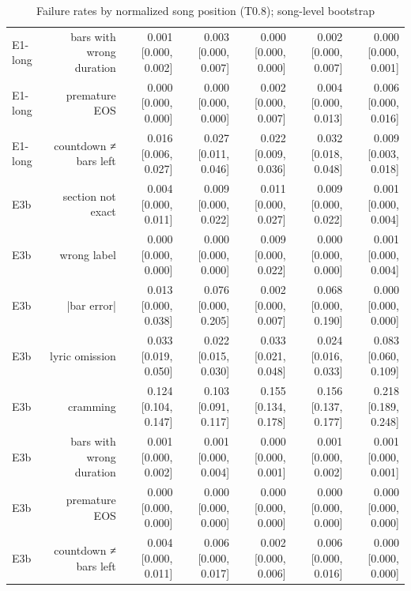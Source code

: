 \begin{table}[t]
\begin{tabular}{lrrrrrr}
E1-long & bars with wrong duration & 0.001 [0.000, 0.002] & 0.003 [0.000, 0.007] & 0.000 [0.000, 0.000] & 0.002 [0.000, 0.007] & 0.000 [0.000, 0.001] \\
E1-long & premature EOS & 0.000 [0.000, 0.000] & 0.000 [0.000, 0.000] & 0.002 [0.000, 0.007] & 0.004 [0.000, 0.013] & 0.006 [0.000, 0.016] \\
E1-long & countdown ≠ bars left & 0.016 [0.006, 0.027] & 0.027 [0.011, 0.046] & 0.022 [0.009, 0.036] & 0.032 [0.018, 0.048] & 0.009 [0.003, 0.018] \\
E3b & section not exact & 0.004 [0.000, 0.011] & 0.009 [0.000, 0.022] & 0.011 [0.000, 0.027] & 0.009 [0.000, 0.022] & 0.001 [0.000, 0.004] \\
E3b & wrong label & 0.000 [0.000, 0.000] & 0.000 [0.000, 0.000] & 0.009 [0.000, 0.022] & 0.000 [0.000, 0.000] & 0.001 [0.000, 0.004] \\
E3b & |bar error| & 0.013 [0.000, 0.038] & 0.076 [0.000, 0.205] & 0.002 [0.000, 0.007] & 0.068 [0.000, 0.190] & 0.000 [0.000, 0.000] \\
E3b & lyric omission & 0.033 [0.019, 0.050] & 0.022 [0.015, 0.030] & 0.033 [0.021, 0.048] & 0.024 [0.016, 0.033] & 0.083 [0.060, 0.109] \\
E3b & cramming & 0.124 [0.104, 0.147] & 0.103 [0.091, 0.117] & 0.155 [0.134, 0.178] & 0.156 [0.137, 0.177] & 0.218 [0.189, 0.248] \\
E3b & bars with wrong duration & 0.001 [0.000, 0.002] & 0.001 [0.000, 0.004] & 0.000 [0.000, 0.001] & 0.001 [0.000, 0.002] & 0.001 [0.000, 0.001] \\
E3b & premature EOS & 0.000 [0.000, 0.000] & 0.000 [0.000, 0.000] & 0.000 [0.000, 0.000] & 0.000 [0.000, 0.000] & 0.000 [0.000, 0.000] \\
E3b & countdown ≠ bars left & 0.004 [0.000, 0.011] & 0.006 [0.000, 0.017] & 0.002 [0.000, 0.006] & 0.006 [0.000, 0.016] & 0.000 [0.000, 0.000] \\
\bottomrule
\end{tabular}
\caption{Failure rates by normalized song position (T0.8); song-level bootstrap}
\label{tab:long_range_T08}
\end{table}
